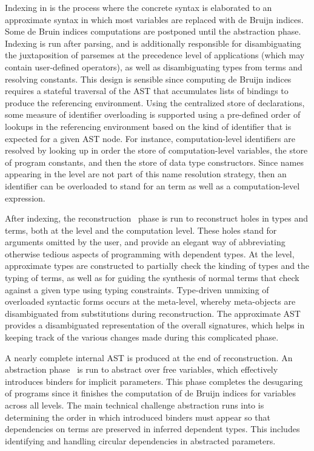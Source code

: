 Indexing in \Beluga is the process where the concrete syntax is elaborated to an approximate syntax in which most variables are replaced with de Bruijn indices.
Some de Bruin indices computations are postponed until the abstraction phase.
Indexing is run after parsing, and is additionally responsible for disambiguating the juxtaposition of \LF parsemes at the precedence level of applications (which may contain user-defined operators), as well as disambiguating \LF types from terms and resolving constants.
This design is sensible since computing de Bruijn indices requires a stateful traversal of the \ac{AST} that accumulates lists of bindings to produce the referencing environment.
Using the centralized store of declarations, some measure of identifier overloading is supported using a pre-defined order of lookups in the referencing environment based on the kind of identifier that is expected for a given \ac{AST} node.
For instance, computation-level identifiers are resolved by looking up in order the store of computation-level variables, the store of program constants, and then the store of data type constructors.
Since names appearing in the \LF level are not part of this name resolution strategy, then an identifier can be overloaded to stand for an \LF term as well as a computation-level expression.

After indexing, the reconstruction~\cite{pientka2013insider} phase is run to reconstruct holes in types and terms, both at the \LF level and the computation level.
These holes stand for arguments omitted by the user, and provide an elegant way of abbreviating otherwise tedious aspects of programming with dependent types.
At the \LF level, approximate types are constructed to partially check the kinding of \LF types and the typing of \LF terms, as well as for guiding the synthesis of normal terms that check against a given type using typing constraints.
Type-driven unmixing of overloaded syntactic forms occurs at the meta-level, whereby meta-objects are disambiguated from substitutions during reconstruction.
The approximate \ac{AST} provides a disambiguated representation of the overall \Beluga signatures, which helps in keeping track of the various changes made during this complicated phase.

A nearly complete internal \ac{AST} is produced at the end of reconstruction.
An abstraction phase~\cite{germain2010implementation} is run to abstract over free variables, which effectively introduces binders for implicit parameters.
This phase completes the desugaring of \Beluga programs since it finishes the computation of de Bruijn indices for variables across all levels.
The main technical challenge abstraction runs into is determining the order in which introduced binders must appear so that dependencies on terms are preserved in inferred dependent types.
This includes identifying and handling circular dependencies in abstracted parameters.

